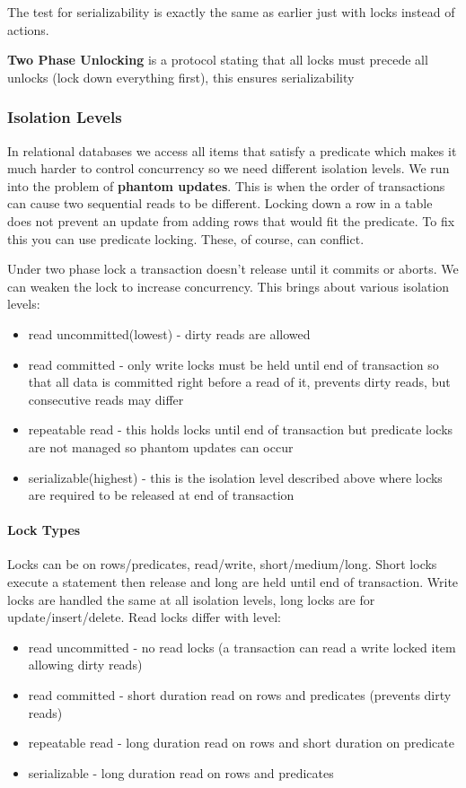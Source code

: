 \documentclass{article}
\begin{document}
The test for serializability is exactly the same as earlier just with locks instead of actions.

\textbf{Two Phase Unlocking} is a protocol stating that all locks must precede all unlocks (lock down everything first), this ensures serializability

\subsubsection*{Isolation Levels} %
\label{ssub:isolation_levels}
In relational databases we access all items that satisfy a predicate which makes it much harder to control concurrency so we need different isolation levels. We run into the problem of \textbf{phantom updates}. This is when the order of transactions can cause two sequential reads to be different. Locking down a row in a table does not prevent an update from adding rows that would fit the predicate. To fix this you can use predicate locking. These, of course, can conflict.

Under two phase lock a transaction doesn't release until it commits or aborts. We can weaken the lock to increase concurrency. This brings about various isolation levels:
\begin{itemize}
    \item read uncommitted(lowest) - dirty reads are allowed
    \item read committed - only write locks must be held until end of transaction so that all data is committed right before a read of it, prevents dirty reads, but consecutive reads may differ
    \item repeatable read - this holds locks until end of transaction but predicate locks are not managed so phantom updates can occur
    \item serializable(highest) - this is the isolation level described above where locks are required to be released at end of transaction
\end{itemize}

\paragraph{Lock Types} %
\label{par:lock_types}
Locks can be on rows/predicates, read/write, short/medium/long. Short locks execute a statement then release and long are held until end of transaction. Write locks are handled the same at all isolation levels, long locks are for update/insert/delete. Read locks differ with level:
\begin{itemize}
     \item read uncommitted - no read locks (a transaction can read a write locked item allowing dirty reads)
     \item read committed - short duration read on rows and predicates (prevents dirty reads)
     \item repeatable read - long duration read on rows and short duration on predicate
     \item serializable - long duration read on rows and predicates
 \end{itemize}
\end{document}

